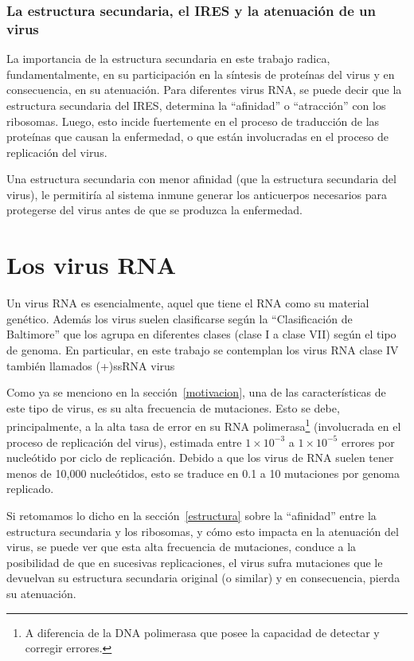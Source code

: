 \subsubsection{La estructura secundaria, el \ac{IRES} y la atenuaci\'on de un
virus}

La importancia de la estructura secundaria en este trabajo radica,
fundamentalmente, en su participaci\'on en la s\'intesis de prote\'inas del
virus y en consecuencia, en su atenuaci\'on. Para diferentes virus \ac{RNA}, se
puede decir que la estructura secundaria del \ac{IRES}, determina la
``afinidad'' o ``atracci\'on'' con los ribosomas. Luego, esto incide fuertemente
en el proceso de traducci\'on de las prote\'inas que causan la enfermedad, o que
est\'an involucradas en el proceso de replicaci\'on del virus. 

Una estructura secundaria con menor afinidad (que la estructura secundaria del
virus), le permitir\'ia al sistema inmune generar los anticuerpos necesarios
para protegerse del virus antes de que se produzca la enfermedad.

\section{Los virus \ac{RNA}}
\label{virus}
Un virus \ac{RNA} es esencialmente, aquel que tiene el \ac{RNA} como su
material gen\'etico. Adem\'as los virus suelen clasificarse seg\'un la
``Clasificaci\'on de Baltimore'' que los agrupa en diferentes clases (clase I a
clase VII) seg\'un el tipo de genoma. En particular, en este trabajo se
contemplan los virus \ac{RNA} clase IV tambi\'en llamados \ac{(+)ssRNA virus}

Como ya se menciono en la secci\'on~\ref{motivacion}, una de las
caracter\'isticas de este tipo de virus, es su alta frecuencia de mutaciones.
Esto se debe, principalmente, a la alta tasa de error en su \ac{RNA}
polimerasa\footnote{A diferencia de la \ac{DNA} polimerasa que posee la
capacidad de detectar y corregir errores.} (involucrada en el proceso de
replicaci\'on del virus), estimada entre $1\times10^{-3}$ a $1\times10^{-5}$
errores por nucle\'otido por ciclo de replicaci\'on\cite{Vignuzzi08}. Debido a
que los virus de \ac{RNA} suelen tener menos de 10,000 nucle\'otidos, esto se
traduce en 0.1 a 10 mutaciones por genoma replicado.

Si retomamos lo dicho en la secci\'on~\ref{estructura} sobre la ``afinidad''
entre la estructura secundaria y los ribosomas, y c\'omo esto impacta en la
atenuaci\'on del virus, se puede ver que esta alta frecuencia de mutaciones,
conduce a la posibilidad de que en sucesivas replicaciones, el virus sufra
mutaciones que le devuelvan su estructura secundaria original (o similar) y en
consecuencia, pierda su atenuaci\'on.

